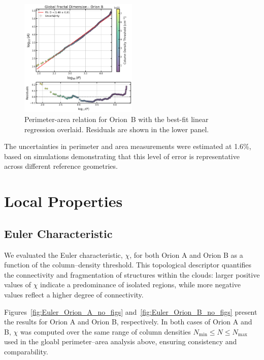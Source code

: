 \begin{figure}[t]
    \centering
    \includegraphics[width=0.5\textwidth]{figures/orion_B_global.png}
    \caption{Perimeter-area relation for Orion~B with the best-fit linear regression overlaid. Residuals are shown in the lower panel.}
    \label{fig:orion_B_global}
\end{figure}

The uncertainties in perimeter and area measurements were estimated at 1.6\%, based on simulations demonstrating that this level of error is representative across different reference geometries.

\section{Local Properties}

\subsection{Euler Characteristic}

We evaluated the Euler characteristic, \(\chi\), for both Orion A and Orion B as a function of the column–density threshold. This topological descriptor quantifies the connectivity and fragmentation of structures within the clouds: larger positive values of \(\chi\) indicate a predominance of isolated regions, while more negative values reflect a higher degree of connectivity.

Figures~\ref{fig:Euler_Orion_A_no_figs} and~\ref{fig:Euler_Orion_B_no_figs} present the results for Orion A and Orion B, respectively. In both cases of Orion A and B, \(\chi\) was computed over the same range of column densities \(N_\mathrm{min} \leq N \leq N_\mathrm{max}\) used in the gloabl perimeter–area analysis above, ensuring consistency and comparability.

